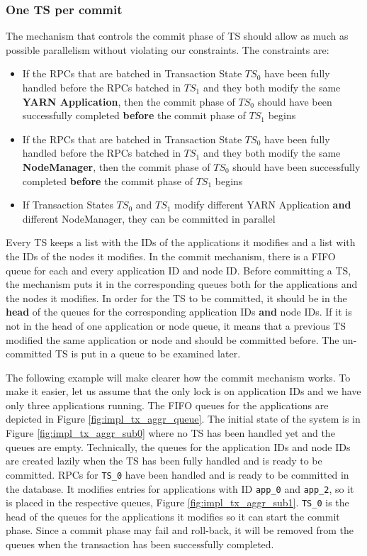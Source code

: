 \subsubsection{One TS per commit}
\label{sssec:impl_aggr_old}
The mechanism that controls the commit phase of TS should allow as
much as possible parallelism without violating our constraints. The
constraints are:
\begin{itemize}
\item If the RPCs that are batched in Transaction State $TS_0$ have
  been fully handled before the RPCs batched in $TS_1$ and they both
  modify the same \textbf{YARN Application}, then the commit phase of $TS_0$
  should have been successfully completed \textbf{before} the commit
  phase of $TS_1$ begins

\item If the RPCs that are batched in Transaction State $TS_0$ have
  been fully handled before the RPCs batched in $TS_1$ and they both
  modify the same \textbf{NodeManager}, then the commit phase of $TS_0$
  should have been successfully completed \textbf{before} the commit
  phase of $TS_1$ begins

\item If Transaction States $TS_0$ and $TS_1$ modify different YARN
  Application \textbf{and} different NodeManager, they can be committed in parallel
\end{itemize}

Every TS keeps a list with the IDs of the applications it modifies and
a list with the IDs of the nodes it modifies. In the commit mechanism,
there is a FIFO queue for each and every application ID and node
ID. Before committing a TS, the mechanism puts it in the corresponding
queues both for the applications and the nodes it modifies. In order for
the TS to be committed, it should be in the \textbf{head} of the
queues for the corresponding application IDs \textbf{and} node IDs. If
it is not in the head of one application or node queue, it means that
a previous TS modified the same application or node and should be
committed before. The un-committed TS is put in a queue to be
examined later.

The following example will make clearer how the commit mechanism works.
To make it easier, let us assume that the only lock is on
application IDs and we have only three applications running. The FIFO
queues for the applications are depicted in Figure
\ref{fig:impl_tx_aggr_queue}. The initial state of the system is in
Figure \ref{fig:impl_tx_aggr_sub0} where no TS has been handled yet
and the queues are empty. Technically, the queues for the application
IDs and node IDs are created lazily when the TS has been fully handled
and is ready to be committed. RPCs for \texttt{TS\_0} have been
handled and is ready to be committed in the database. It modifies
entries for applications with ID \texttt{app\_0} and \texttt{app\_2},
so it is placed in the respective queues, Figure
\ref{fig:impl_tx_aggr_sub1}. \texttt{TS\_0} is the head
of the queues for the applications it modifies so it can start the
commit phase. Since a commit phase may fail and roll-back, it will be
removed from the queues when the transaction has been successfully
completed.

